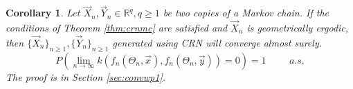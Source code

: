 \documentclass[12pt]{article}
\theoremstyle{plain}%
\newtheorem{cor}{Corollary}
\theoremstyle{definition}
\begin{document}
	\begin{cor}\label{cor:convwp1}
		Let $\vec{X}_n,\vec{Y}_n\in \mathbb{R}^q, q\geq 1$ be two copies of a Markov chain. If the conditions of Theorem \ref{thm:crnmc} are satisfied and $\vec{X}_n$ is geometrically ergodic, then $\{\vec{X}_n\}_{n\geq 1}, \{\vec{Y}_n\}_{n\geq 1}$ generated using CRN will converge almost surely. 
		$$P(\lim_{n\to \infty}k(f_n(\Theta_n,\vec{x}),f_n(\Theta_n,\vec{y}))=0)= 1\hspace{1cm} a.s.$$
		The proof is in Section \ref{sec:convwp1}.
%			
%			
	\end{cor}
\end{document}
